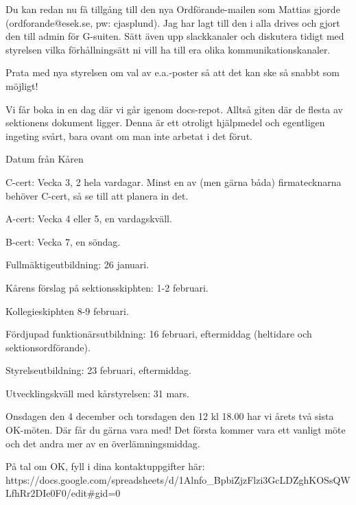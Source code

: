 \documentclass[10pt]{article}
\begin{document}
\begin{numplist}
    \item Du kan redan nu få tillgång till den nya Ordförande-mailen som Mattias gjorde (ordforande@esek.se, pw: cjasplund). Jag har lagt till den i alla drives och gjort den till admin för G-suiten. Sätt även upp slackkanaler och diskutera tidigt med styrelsen vilka förhållningsätt ni vill ha till era olika kommunikationskanaler.
    
    \item Prata med nya styrelsen om val av e.a.-poster så att det kan ske så snabbt som möjligt!

    \item Vi får boka in en dag där vi går igenom docs-repot. Alltså giten där de flesta av sektionens dokument ligger. Denna är ett otroligt hjälpmedel och egentligen ingeting svårt, bara ovant om man inte arbetat i det förut. 

   
    \item Datum från Kåren
    \begin{dashlist}
        \item C-cert: Vecka 3, 2 hela vardagar. Minst en av (men gärna båda) firmatecknarna behöver C-cert, så se till att planera in det.
        \item A-cert: Vecka 4 eller 5, en vardagskväll. 
        \item B-cert: Vecka 7, en söndag.
        \item Fullmäktigeutbildning: 26 januari.
        \item Kårens förslag på sektionsskiphten: 1-2 februari.
        \item Kollegieskiphten 8-9 februari.
        \item Fördjupad funktionärsutbildning: 16 februari, eftermiddag (heltidare och sektionsordförande).
        \item Styrelseutbildning: 23 februari, eftermiddag.
        \item Utvecklingskväll med kårstyrelsen: 31 mars.
    \end{dashlist}
    
    \item Onsdagen den 4 december och torsdagen den 12 kl 18.00 har vi årets två sista OK-möten. Där får du gärna vara med! Det första kommer vara ett vanligt möte och det andra mer av en överlämningsmiddag.
    
    \item På tal om OK, fyll i dina kontaktuppgifter här: https://docs.google.com/spreadsheets/d/1Alnfo_BpbiZjzFlzi3GcLDZghKOSsQWLfhRr2DIe0F0/edit#gid=0


\end{numplist}
\end{document}
